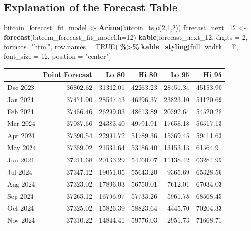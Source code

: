 \documentclass[
]{book}
\newenvironment{Shaded}{\begin{snugshade}}{\end{snugshade}}
\newcommand{\AttributeTok}[1]{\textcolor[rgb]{0.13,0.29,0.53}{#1}}
\newcommand{\ConstantTok}[1]{\textcolor[rgb]{0.56,0.35,0.01}{#1}}
\newcommand{\DecValTok}[1]{\textcolor[rgb]{0.00,0.00,0.81}{#1}}
\newcommand{\FunctionTok}[1]{\textcolor[rgb]{0.13,0.29,0.53}{\textbf{#1}}}
\newcommand{\NormalTok}[1]{#1}
\newcommand{\OtherTok}[1]{\textcolor[rgb]{0.56,0.35,0.01}{#1}}
\newcommand{\SpecialCharTok}[1]{\textcolor[rgb]{0.81,0.36,0.00}{\textbf{#1}}}
\newcommand{\StringTok}[1]{\textcolor[rgb]{0.31,0.60,0.02}{#1}}
\begin{document}
\subsection{Explanation of the Forecast Table}\label{explanation-of-the-forecast-table}

\begin{Shaded}
\begin{Highlighting}[]
\NormalTok{bitcoin\_forecast\_fit\_model }\OtherTok{\textless{}{-}} \FunctionTok{Arima}\NormalTok{(bitcoin\_ts,}\FunctionTok{c}\NormalTok{(}\DecValTok{2}\NormalTok{,}\DecValTok{1}\NormalTok{,}\DecValTok{2}\NormalTok{))}
\NormalTok{forecast\_next\_12 }\OtherTok{\textless{}{-}} \FunctionTok{forecast}\NormalTok{(bitcoin\_forecast\_fit\_model,}\AttributeTok{h=}\DecValTok{12}\NormalTok{)}
\FunctionTok{kable}\NormalTok{(forecast\_next\_12, }\AttributeTok{digits =} \DecValTok{2}\NormalTok{, }\AttributeTok{formats=}\StringTok{"html"}\NormalTok{, }\AttributeTok{row.names =} \ConstantTok{TRUE}\NormalTok{) }\SpecialCharTok{\%\textgreater{}\%}
  \FunctionTok{kable\_styling}\NormalTok{(}\AttributeTok{full\_width =}\NormalTok{ F, }\AttributeTok{font\_size =} \DecValTok{12}\NormalTok{, }\AttributeTok{position =} \StringTok{"center"}\NormalTok{)}
\end{Highlighting}
\end{Shaded}

\begin{table}
\centering\begingroup\fontsize{12}{14}\selectfont

\begin{tabular}{l|r|r|r|r|r}
\hline
  & Point Forecast & Lo 80 & Hi 80 & Lo 95 & Hi 95\\
\hline
Dec 2023 & 36802.62 & 31342.01 & 42263.23 & 28451.34 & 45153.90\\
\hline
Jan 2024 & 37471.90 & 28547.43 & 46396.37 & 23823.10 & 51120.69\\
\hline
Feb 2024 & 37456.46 & 26299.03 & 48613.89 & 20392.64 & 54520.28\\
\hline
Mar 2024 & 37087.66 & 24383.40 & 49791.91 & 17658.18 & 56517.13\\
\hline
Apr 2024 & 37390.54 & 22991.72 & 51789.36 & 15369.45 & 59411.63\\
\hline
May 2024 & 37359.02 & 21531.64 & 53186.40 & 13153.13 & 61564.91\\
\hline
Jun 2024 & 37211.68 & 20163.29 & 54260.07 & 11138.42 & 63284.95\\
\hline
Jul 2024 & 37347.12 & 19051.05 & 55643.20 & 9365.69 & 65328.56\\
\hline
Aug 2024 & 37323.02 & 17896.03 & 56750.01 & 7612.01 & 67034.03\\
\hline
Sep 2024 & 37265.12 & 16796.97 & 57733.26 & 5961.78 & 68568.45\\
\hline
Oct 2024 & 37325.02 & 15826.39 & 58823.64 & 4445.70 & 70204.33\\
\hline
Nov 2024 & 37310.22 & 14844.41 & 59776.03 & 2951.73 & 71668.71\\
\hline
\end{tabular}
\endgroup{}
\end{table}
\end{document}
